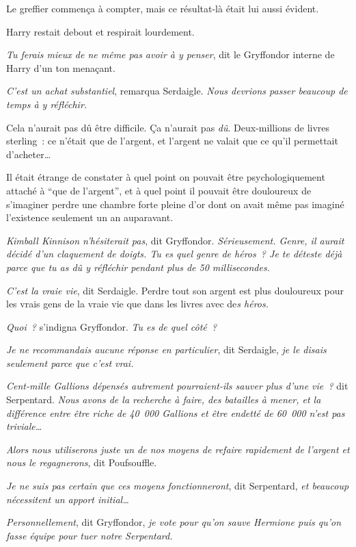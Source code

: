 Le greffier commença à compter, mais ce résultat-là était lui aussi évident.

Harry restait debout et respirait lourdement.

\emph{Tu ferais mieux de ne même pas avoir à y penser}, dit le Gryffondor interne de Harry d'un ton menaçant.

\emph{C'est un achat substantiel}, remarqua Serdaigle.
\emph{Nous devrions passer beaucoup de temps à y réfléchir.}

Cela n'aurait pas dû être difficile.
Ça n'aurait pas \emph{dû}.
Deux-millions de livres sterling~: ce n'était que de l'argent, et l'argent ne valait que ce qu'il permettait d'acheter…

Il était étrange de constater à quel point on pouvait être psychologiquement attaché à “que de l'argent”, et à quel point il pouvait être douloureux de s'imaginer perdre une chambre forte pleine d'or dont on avait même pas imaginé l'existence seulement un an auparavant.

\emph{Kimball Kinnison n'hésiterait pas}, dit Gryffondor.
\emph{Sérieusement.
Genre, il aurait décidé d'un claquement de doigts.
Tu es quel genre de héros~?
Je te déteste déjà parce que tu as dû y réfléchir pendant plus de 50 millisecondes.}

\emph{C'est la vraie vie}, dit Serdaigle.
Perdre tout son argent est plus douloureux pour les vrais gens de la vraie vie que dans les livres avec de\emph{s héros.}

\emph{Quoi~?} s'indigna Gryffondor.
\emph{Tu es de quel côté~?}

\emph{Je ne recommandais aucune réponse en particulier}, dit Serdaigle, \emph{je le disais seulement parce que c'est vrai.}

\emph{Cent-mille Gallions dépensés autrement pourraient-ils sauver plus d'une vie~?} dit Serpentard.
\emph{Nous avons de la recherche à faire, des batailles à mener, et la différence entre être riche de 40~000 Gallions et être endetté de 60~000 n'est pas triviale…}

\emph{Alors nous utiliserons juste un de nos moyens de refaire rapidement de l'argent et nous le regagnerons}, dit Poufsouffle.

\emph{Je ne suis pas certain que ces moyens fonctionneront}, dit Serpentard, \emph{et beaucoup nécessitent un apport initial…}

\emph{Personnellement}, dit Gryffondor, \emph{je vote pour qu'on sauve Hermione puis qu'on fasse équipe pour tuer notre Serpentard.}

